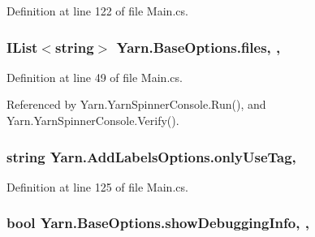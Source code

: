 Definition at line 122 of file Main.\-cs.

\hypertarget{a00041_aa93cbb1bc1d5328e0a417012621e92d2}{
\subsubsection[{files}]{\setlength{\rightskip}{0pt plus 5cm}I\-List$<$string$>$ Yarn.\-Base\-Options.\-files\hspace{0.3cm}{\ttfamily [get]}, {\ttfamily [set]}, {\ttfamily [inherited]}}}\label{a00041_aa93cbb1bc1d5328e0a417012621e92d2}


Definition at line 49 of file Main.\-cs.



Referenced by Yarn.\-Yarn\-Spinner\-Console.\-Run(), and Yarn.\-Yarn\-Spinner\-Console.\-Verify().

\hypertarget{a00037_ab6162338f9606a836f3101fe0e228249}{
\subsubsection[{only\-Use\-Tag}]{\setlength{\rightskip}{0pt plus 5cm}string Yarn.\-Add\-Labels\-Options.\-only\-Use\-Tag\hspace{0.3cm}{\ttfamily [get]}, {\ttfamily [set]}}}\label{a00037_ab6162338f9606a836f3101fe0e228249}


Definition at line 125 of file Main.\-cs.

\hypertarget{a00041_a89964ea17bd19caf00cb5bff563ed01c}{
\subsubsection[{show\-Debugging\-Info}]{\setlength{\rightskip}{0pt plus 5cm}bool Yarn.\-Base\-Options.\-show\-Debugging\-Info\hspace{0.3cm}{\ttfamily [get]}, {\ttfamily [set]}, {\ttfamily [inherited]}}}\label{a00041_a89964ea17bd19caf00cb5bff563ed01c}


